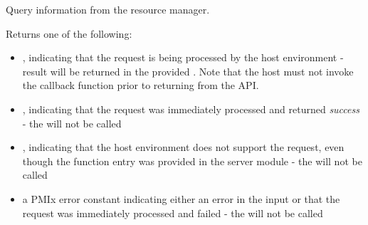 \summary

Query information from the resource manager.

\format


\begin{arglist}
\end{arglist}

Returns one of the following:

\begin{itemize}
    \item {}, indicating that the request is being processed by the host environment - result will be returned in the provided . Note that the host must not invoke the callback function prior to returning from the \ac{API}.
    \item {}, indicating that the request was immediately processed and returned \textit{success} - the  will not be called
    \item {}, indicating that the host environment does not support the request, even though the function entry was provided in the server module - the  will not be called
    \item a PMIx error constant indicating either an error in the input or that the request was immediately processed and failed - the  will not be called
\end{itemize}

